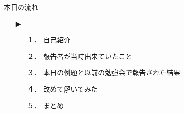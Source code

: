 \begin{frame}{本日の流れ}
  \begin{itemize}
     \item[▶] 
     \begin{itemize}[itemsep=1.3ex, leftmargin=1cm]
       \item[１．] 自己紹介
       \item[２．] 報告者が当時出来ていたこと
       \item[３．] 本日の例題と以前の勉強会で報告された結果
       \item[４．] 改めて解いてみた
       \item[５．] まとめ
    \end{itemize}
  \end{itemize}
\end{frame}
